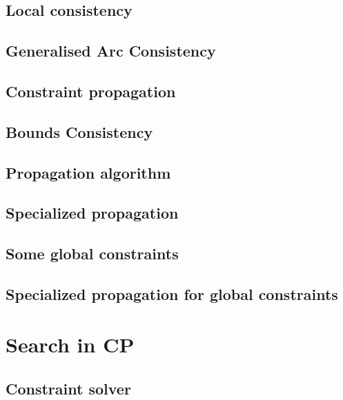 \documentclass[12pt,a4paper,twoside]{book}
\begin{document}
\section{Local consistency}

\label{s_3_1}

\section{Generalised Arc Consistency}

\label{s_3_2}

\section{Constraint propagation}

\label{s_3_3}

\section{Bounds Consistency}

\label{s_3_4}

\section{Propagation algorithm}

\label{s_3_5}

\section{Specialized propagation}

\label{s_3_6}

\section{Some global constraints}

\label{s_3_7}

\section{Specialized propagation for global constraints}

\label{s_3_8}

\chapter{Search in CP}

\label{c_4}

\section{Constraint solver}

\label{s_4_1}
\end{document}

